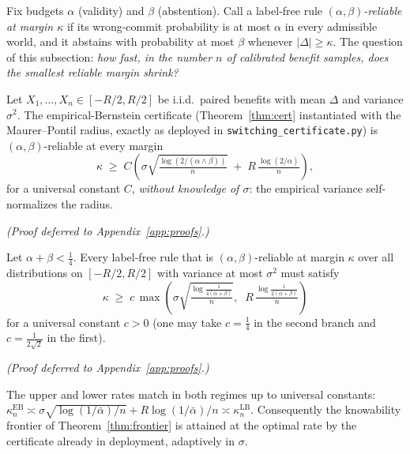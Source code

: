 
Fix budgets $\alpha$ (validity) and $\beta$ (abstention). Call a label-free rule
\emph{$(\alpha,\beta)$-reliable at margin $\kappa$} if its wrong-commit probability is at
most $\alpha$ in every admissible world, and it abstains with probability at most $\beta$
whenever $|\Delta|\ge\kappa$. The question of this subsection: \emph{how fast, in the
number $n$ of calibrated benefit samples, does the smallest reliable margin shrink?}

\begin{theorem}\label{thm:rate-ub}
Let $X_1,\dots,X_n\in[-R/2,R/2]$ be i.i.d.\ paired benefits with mean $\Delta$ and
variance $\sigma^2$. The empirical-Bernstein certificate (Theorem~\ref{thm:cert}
instantiated with the Maurer--Pontil radius, exactly as deployed in
\texttt{switching\_certificate.py}) is $(\alpha,\beta)$-reliable at every margin
\[
\kappa\;\ge\;C\!\left(\sigma\sqrt{\tfrac{\log(2/(\alpha\wedge\beta))}{n}}
\;+\;R\,\tfrac{\log(2/\alpha)}{n}\right),
\]
for a universal constant $C$, \emph{without knowledge of $\sigma$}: the empirical
variance self-normalizes the radius.
\end{theorem}
\emph{(Proof deferred to Appendix~\ref{app:proofs}.)}

\begin{theorem}\label{thm:rate-lb}
Let $\alpha+\beta<\tfrac14$. Every label-free rule that is $(\alpha,\beta)$-reliable at
margin $\kappa$ over all distributions on $[-R/2,R/2]$ with variance at most $\sigma^2$
must satisfy
\[
\kappa\;\ge\;c\,\max\!\left(\sigma\sqrt{\tfrac{\log\frac{1}{4(\alpha+\beta)}}{n}},\;\;
R\,\tfrac{\log\frac{1}{2(\alpha+\beta)}}{n}\right)
\]
for a universal constant $c>0$ (one may take $c=\tfrac14$ in the second branch and
$c=\tfrac{1}{2\sqrt2}$ in the first).
\end{theorem}
\emph{(Proof deferred to Appendix~\ref{app:proofs}.)}

\begin{proposition}\label{prop:rate-opt}
The upper and lower rates match in both regimes up to universal constants:
$\kappa_n^{\mathrm{EB}}\asymp \sigma\sqrt{\log(1/\bar\alpha)/n}+R\log(1/\bar\alpha)/n
\asymp\kappa_n^{\mathrm{LB}}$. Consequently the knowability frontier of
Theorem~\ref{thm:frontier} is attained at the optimal rate by the certificate already
in deployment, adaptively in $\sigma$.
\end{proposition}

